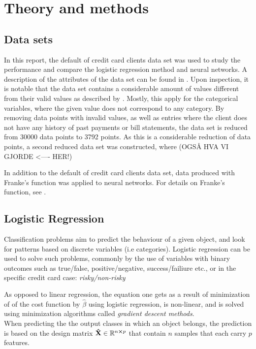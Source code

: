 \section{Theory and methods}
\label{sec:theory}

\subsection{Data sets}
\label{sec:datasets}
In this report, the default of credit card clients data set \citep{yeh2009UCI} was used to study the performance and compare the logistic regression method and neural networks. A description of the attributes of the data set can be found in \cite{yeh2009UCI}. Upon inspection, it is notable that the data set contains a considerable amount of values different from their valid values as described by \citeauthor{yeh2009UCI}. Mostly, this apply for the categorical variables, where the given value does not correspond to any category. By removing data points with invalid values, as well as entries where the client does not have any history of past payments or bill statements, the data set is reduced from 30000 data points to 3792 points. As this is a considerable reduction of data points, a second reduced data set was constructed, where (OGSÅ HVA VI GJORDE <---- HER!)

In addition to the default of credit card clients data set, data produced with Franke's function was applied to neural networks. For details on Franke's function, see \cite{prosjekt1}.

\subsection{Logistic Regression}
Classification problems aim to predict the behaviour of a given object, and look for patterns based on discrete variables (i.e categories). Logistic regression can be used to solve such problems, commonly by the use of variables with binary outcomes such as true/false, positive/negative, success/failiure etc., or in the specific credit card case: \textit{risky/non-risky} \cite{LogRegLectures}

As opposed to linear regression, the equation one gets as a result of minimization of of the cost function by $\hat{\beta}$ using logistic regression, is non-linear, and is solved using minimization algorithms called \emph{gradient descent methods}. \\

When predicting the the output classes in which an object belongs, the prediction is based on the design matrix $\mathbf{\hat{X}} \in \mathbb{R}^{n\cross p}$ that contain $n$ samples that each carry $p$ features.

